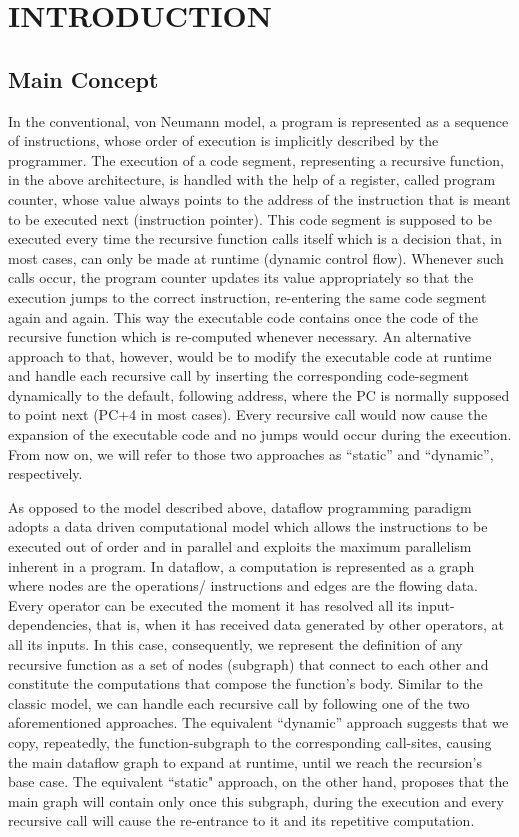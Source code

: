 \documentclass[ack,preface]{dithesis}
\begin{document}
\frontmatter

\mainmatter

\chapter{INTRODUCTION}
    \section{Main Concept}
	In the conventional, von Neumann model, a program is represented as a sequence of instructions, whose order of execution is implicitly described by the programmer.
The execution of a code segment, representing a recursive function, in the above architecture, is handled with the help of a register, called program counter, whose value always points to the address of the instruction that is meant to be executed next (instruction pointer). This code segment is supposed to be executed every time the recursive function calls itself which is a decision that, in most cases, can only be made at runtime (dynamic control flow). Whenever such calls occur, the program counter updates its value appropriately so that the execution jumps to the correct instruction, re-entering the same code segment again and again. This way the executable code contains once the code of the recursive function which is re-computed whenever necessary. An alternative approach to that, however, would be to modify the executable code at runtime  and handle each recursive call by inserting the corresponding code-segment dynamically to the default, following address, where the PC is normally supposed to point next (PC+4 in most cases). Every recursive call would now cause the expansion of the executable code and no jumps would occur during the execution.
From now on, we will refer to those two approaches as ``static'' and ``dynamic'', respectively.

As opposed to the model described above, dataflow programming paradigm adopts a data driven computational model which allows the instructions to be executed out of order and in parallel and exploits the maximum parallelism inherent in a program. In dataflow, a computation is represented as a graph where nodes are the operations/ instructions and edges are the flowing data. Every operator can be executed the moment it has resolved all its input-dependencies, that is, when it has received data generated  by other operators, at all its inputs.
In this case, consequently, we represent the definition of any recursive function as  a set of nodes (subgraph) that connect to each other and constitute the computations that compose the function’s body. Similar to the classic model, we can handle each recursive call by following one of the two aforementioned approaches. 
 The equivalent ``dynamic'' approach suggests that we copy, repeatedly, the function-subgraph to the corresponding call-sites, causing the main dataflow graph to expand at runtime, until we reach the recursion's base case. The equivalent ``static" approach, on the other hand, proposes that the main graph will contain only once this subgraph, during the execution and every recursive call will cause the re-entrance to it and its repetitive computation.
\end{document}
